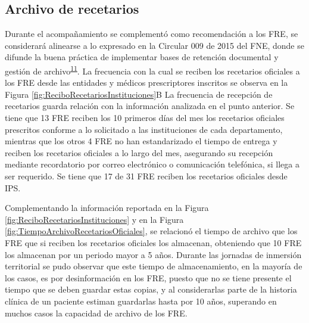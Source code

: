 \documentclass[
]{book}
\begin{document}
\hypertarget{archivo-de-recetarios}{%
\subsection{Archivo de recetarios}\label{archivo-de-recetarios}}

Durante el acompañamiento se complementó como recomendación a los FRE, se considerará alinearse a lo expresado en la Circular 009 de 2015 del FNE, donde se difunde la buena práctica de implementar bases de retención documental y gestión de archivo\textsuperscript{\protect\hyperlink{ref-FNE2015-9}{11}}. La frecuencia con la cual se reciben los recetarios oficiales a los FRE desde las entidades y médicos prescriptores inscritos se observa en la Figura \ref{fig:ReciboRecetariosInstituciones}B La frecuencia de recepción de recetarios guarda relación con la información analizada en el punto anterior. Se tiene que 13 FRE reciben los 10 primeros días del mes los recetarios oficiales prescritos conforme a lo solicitado a las instituciones de cada departamento, mientras que los otros 4 FRE no han estandarizado el tiempo de entrega y reciben los recetarios oficiales a lo largo del mes, asegurando su recepción mediante recordatorio por correo electrónico o comunicación telefónica, si llega a ser requerido. Se tiene que 17 de 31 FRE reciben los recetarios oficiales desde IPS.

Complementando la información reportada en la Figura \ref{fig:ReciboRecetariosInstituciones} y en la Figura \ref{fig:TiempoArchivoRecetariosOficiales}, se relacionó el tiempo de archivo que los FRE que si reciben los recetarios oficiales los almacenan, obteniendo que 10 FRE los almacenan por un periodo mayor a 5 años. Durante las jornadas de inmersión territorial se pudo observar que este tiempo de almacenamiento, en la mayoría de los casos, es por desinformación en los FRE, puesto que no se tiene presente el tiempo que se deben guardar estas copias, y al considerarlas parte de la historia clínica de un paciente estiman guardarlas hasta por 10 años, superando en muchos casos la capacidad de archivo de los FRE.
\end{document}
